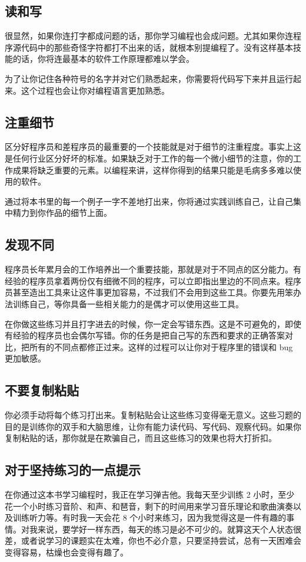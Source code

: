 \subsection*{读和写} %
\label{sub:读和写}
很显然，如果你连打字都成问题的话，那你学习编程也会成问题。尤其如果你连程序源代码中的那些奇怪字符都打不出来的话，就根本别提编程了。没有这样基本技能的话，你将连最基本的软件工作原理都难以学会。

为了让你记住各种符号的名字并对它们熟悉起来，你需要将代码写下来并且运行起来。这个过程也会让你对编程语言更加熟悉。
\subsection*{注重细节} %
\label{sub:注重细节}
区分好程序员和差程序员的最重要的一个技能就是对于细节的注重程度。事实上这是任何行业区分好坏的标准。如果缺乏对于工作的每一个微小细节的注意，你的工作成果将缺乏重要的元素。以编程来讲，这样你得到的结果只能是毛病多多难以使用的软件。

通过将本书里的每一个例子一字不差地打出来，你将通过实践训练自己，让自己集中精力到你作品的细节上面。
\subsection*{发现不同} %
\label{sub:发现不同}
程序员长年累月会的工作培养出一个重要技能，那就是对于不同点的区分能力。有经验的程序员拿着两份仅有细微不同的程序，可以立即指出里边的不同点来。程序员甚至造出工具来让这件事更加容易，不过我们不会用到这些工具。你要先用笨办法训练自己，等你具备一些相关能力的是偶才可以使用这些工具。

在你做这些练习并且打字进去的时候，你一定会写错东西。这是不可避免的，即使有经验的程序员也会偶尔写错。你的任务是把自己写的东西和要求的正确答案对比，把所有的不同点都修正过来。这样的过程可以让你对于程序里的错误和 bug 更加敏感。
\subsection*{不要复制粘贴} %
\label{sub:不要复制粘贴}
你必须手动将每个练习打出来。复制粘贴会让这些练习变得毫无意义。这些习题的目的是训练你的双手和大脑思维，让你有能力读代码、写代码、观察代码。如果你复制粘贴的话，那你就是在欺骗自己，而且这些练习的效果也将大打折扣。
\subsection*{对于坚持练习的一点提示} %
\label{sub:对于坚持练习的一点提示}
在你通过这本书学习编程时，我正在学习弹吉他。我每天至少训练 2 小时，至少花一个小时练习音阶、和声、和琶音，剩下的时间用来学习音乐理论和歌曲演奏以及训练听力等。有时我一天会花 8 个小时来练习，因为我觉得这是一件有趣的事情。对我来说，要学好一样东西，每天的练习是必不可少的。就算这天个人状态很差，或者说学习的课题实在太难，你也不必介意，只要坚持尝试，总有一天困难会变得容易，枯燥也会变得有趣了。

